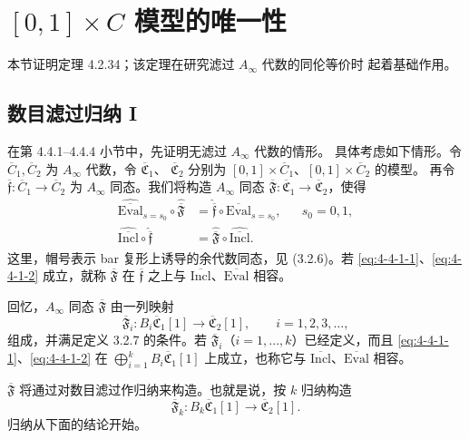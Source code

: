 
\section{$[0,1]\times C$ 模型的唯一性}
\label{sec:4-4}

本节证明定理 4.2.34；该定理在研究滤过 $A_\infty$ 代数的同伦等价时
起着基础作用。

\subsection{数目滤过归纳 I}
\label{subsec:4-4-1}

在第 4.4.1--4.4.4 小节中，先证明无滤过 $A_\infty$ 代数的情形。
具体考虑如下情形。令 $\overline C_1,\overline C_2$ 为
$A_\infty$ 代数，令 $\overline{\mathfrak C}_1$、
$\overline{\mathfrak C}_2$ 分别为
$[0,1]\times\overline C_1$、$[0,1]\times\overline C_2$ 的模型。
再令
$\overline{\mathfrak f}\colon\overline C_1\to\overline C_2$
为 $A_\infty$ 同态。我们将构造
$A_\infty$ 同态
$\overline{\mathfrak F}\colon
\overline{\mathfrak C}_1\to\overline{\mathfrak C}_2$，使得
\begin{align}
 \widehat{\overline{\mathrm{Eval}}}_{s=s_0}
 \circ\widehat{\overline{\mathfrak F}}
 &=\widehat{\overline{\mathfrak f}}
 \circ\widehat{\overline{\mathrm{Eval}}}_{s=s_0},
 &&s_0=0,1,
 \tag{4.4.1.1}\label{eq:4-4-1-1}\\
 \widehat{\overline{\mathrm{Incl}}}
 \circ\widehat{\overline{\mathfrak f}}
 &=\widehat{\overline{\mathfrak F}}
 \circ\widehat{\overline{\mathrm{Incl}}}.
 \tag{4.4.1.2}\label{eq:4-4-1-2}
\end{align}
这里，帽号表示 bar 复形上诱导的余代数同态，见 (3.2.6)。若
\eqref{eq:4-4-1-1}、\eqref{eq:4-4-1-2} 成立，就称
$\overline{\mathfrak F}$ 在 $\overline{\mathfrak f}$ 之上与
$\overline{\mathrm{Incl}}$、$\overline{\mathrm{Eval}}$ 相容。

回忆，$A_\infty$ 同态 $\overline{\mathfrak F}$ 由一列映射
\[
 \overline{\mathfrak F}_i\colon
 B_i\overline{\mathfrak C}_1[1]
 \longrightarrow\overline{\mathfrak C}_2[1],
 \qquad i=1,2,3,\ldots,
\]
组成，并满足定义 3.2.7 的条件。若
$\overline{\mathfrak F}_i$（$i=1,\ldots,k$）已经定义，而且
\eqref{eq:4-4-1-1}、\eqref{eq:4-4-1-2} 在
$\bigoplus_{i=1}^kB_i\overline{\mathfrak C}_1[1]$ 上成立，也称它与
$\overline{\mathrm{Incl}}$、$\overline{\mathrm{Eval}}$ 相容。

$\overline{\mathfrak F}$ 将通过对数目滤过作归纳来构造。也就是说，按
$k$ 归纳构造
\[
 \overline{\mathfrak F}_k\colon
 B_k\overline{\mathfrak C}_1[1]
 \longrightarrow\overline{\mathfrak C}_2[1].
\]
归纳从下面的结论开始。

